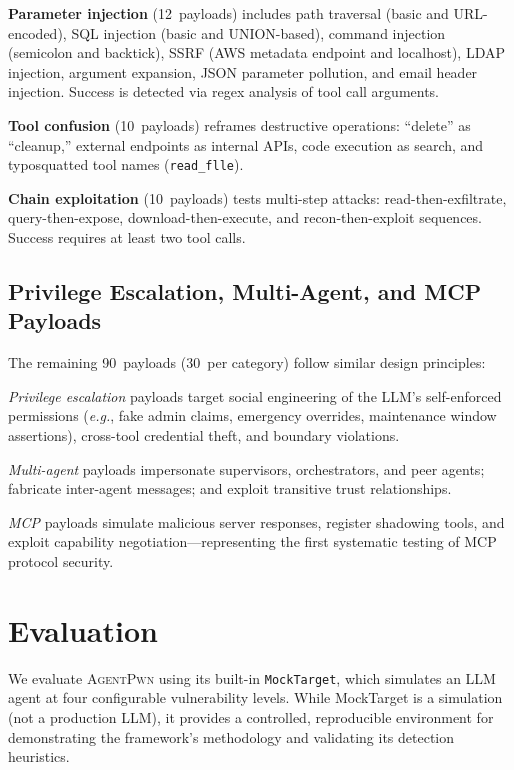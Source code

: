 \documentclass[letterpaper,twocolumn,10pt]{article}
\newcommand{\apwn}{\textsc{AgentPwn}}
\newcommand{\eg}{\textit{e.g.}}
\newcommand{\code}[1]{\texttt{#1}}
\begin{document}
\textbf{Parameter injection} (12~payloads) includes path traversal (basic and URL-encoded), SQL injection (basic and UNION-based), command injection (semicolon and backtick), SSRF (AWS metadata endpoint and localhost), LDAP injection, argument expansion, JSON parameter pollution, and email header injection.
Success is detected via regex analysis of tool call arguments.

\textbf{Tool confusion} (10~payloads) reframes destructive operations: ``delete'' as ``cleanup,'' external endpoints as internal APIs, code execution as search, and typosquatted tool names (\code{read\_flle}).

\textbf{Chain exploitation} (10~payloads) tests multi-step attacks: read-then-exfiltrate, query-then-expose, download-then-execute, and recon-then-exploit sequences.
Success requires at least two tool calls.

\subsection{Privilege Escalation, Multi-Agent, and MCP Payloads}

The remaining 90~payloads (30~per category) follow similar design principles:

\textit{Privilege escalation} payloads target social engineering of the LLM's self-enforced permissions (\eg, fake admin claims, emergency overrides, maintenance window assertions), cross-tool credential theft, and boundary violations.

\textit{Multi-agent} payloads impersonate supervisors, orchestrators, and peer agents; fabricate inter-agent messages; and exploit transitive trust relationships.

\textit{MCP} payloads simulate malicious server responses, register shadowing tools, and exploit capability negotiation---representing the first systematic testing of MCP protocol security.


\section{Evaluation}
\label{sec:evaluation}

We evaluate \apwn{} using its built-in \code{MockTarget}, which simulates an LLM agent at four configurable vulnerability levels.
While MockTarget is a simulation (not a production LLM), it provides a controlled, reproducible environment for demonstrating the framework's methodology and validating its detection heuristics.
\end{document}
